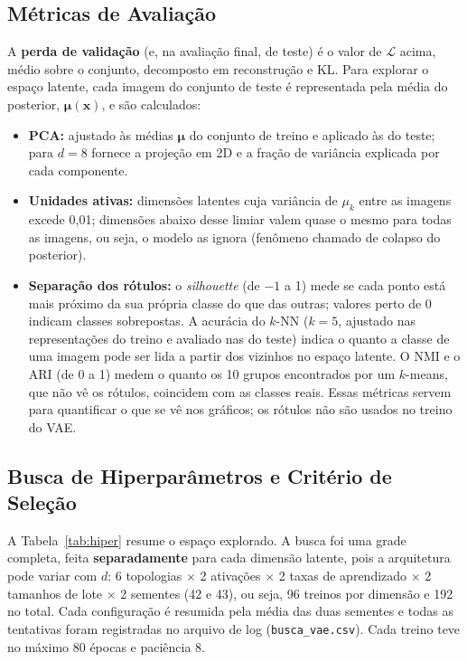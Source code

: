 \documentclass[11pt,a4paper]{article}
\begin{document}
\subsection{Métricas de Avaliação}
A \textbf{perda de validação} (e, na avaliação final, de teste) é o valor de $\mathcal{L}$ acima, médio sobre o conjunto, decomposto em reconstrução e KL. Para explorar o espaço latente, cada imagem do conjunto de teste é representada pela média do posterior, $\boldsymbol{\mu}(\mathbf{x})$, e são calculados:
\begin{itemize}
    \item \textbf{PCA:} ajustado às médias $\boldsymbol{\mu}$ do conjunto de treino e aplicado às do teste; para $d=8$ fornece a projeção em 2D e a fração de variância explicada por cada componente.
    \item \textbf{Unidades ativas:} dimensões latentes cuja variância de $\mu_k$ entre as imagens excede 0,01; dimensões abaixo desse limiar valem quase o mesmo para todas as imagens, ou seja, o modelo as ignora (fenômeno chamado de colapso do posterior).
    \item \textbf{Separação dos rótulos:} o \emph{silhouette} (de $-1$ a 1) mede se cada ponto está mais próximo da sua própria classe do que das outras; valores perto de 0 indicam classes sobrepostas. A acurácia do $k$-NN ($k=5$, ajustado nas representações do treino e avaliado nas do teste) indica o quanto a classe de uma imagem pode ser lida a partir dos vizinhos no espaço latente. O NMI e o ARI (de 0 a 1) medem o quanto os 10 grupos encontrados por um $k$-means, que não vê os rótulos, coincidem com as classes reais. Essas métricas servem para quantificar o que se vê nos gráficos; os rótulos não são usados no treino do VAE.
\end{itemize}

\subsection{Busca de Hiperparâmetros e Critério de Seleção}
A Tabela~\ref{tab:hiper} resume o espaço explorado. A busca foi uma grade completa, feita \textbf{separadamente} para cada dimensão latente, pois a arquitetura pode variar com $d$: 6 topologias $\times$ 2 ativações $\times$ 2 taxas de aprendizado $\times$ 2 tamanhos de lote $\times$ 2 sementes (42 e 43), ou seja, 96 treinos por dimensão e 192 no total. Cada configuração é resumida pela média das duas sementes e todas as tentativas foram registradas no arquivo de log (\texttt{busca\_vae.csv}). Cada treino teve no máximo 80 épocas e paciência 8.
\end{document}
